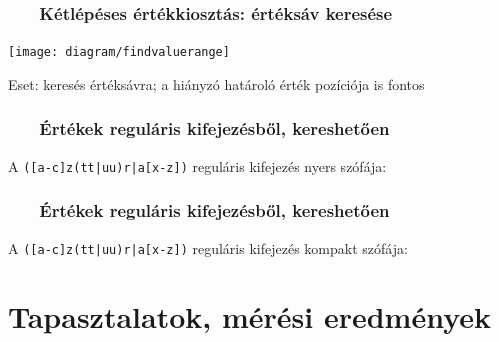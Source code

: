 \documentclass[
    aspectratio=169,
]{beamer}
\newcommand{\slidetitle}[2]{\frametitle{{\small #1 ~ \ding{226} ~ } \normalsize \textbf{#2} }}
\begin{document}
\begin{frame}
    \slidetitle{\sectionshorttitle}{Kétlépéses értékkiosztás: értéksáv keresése}
    
    \centering
    
    \texttt{[image: diagram/findvaluerange]}
    
    \vspace{0.7cm}
    
    Eset: keresés értéksávra; a hiányzó határoló érték pozíciója is fontos
\end{frame}

\begin{frame}[t]
    \slidetitle{\sectionshorttitle}{Értékek reguláris kifejezésből, kereshetően}
    \centering
    {\Large A \texttt{\colorbox{Goldenrod!10}{([a-c]z(tt|uu)r|a[x-z])}} reguláris kifejezés {\color{red}nyers} szófája:}
    
    \vspace{1.2cm}
    
    
\end{frame}

\begin{frame}[t,noframenumbering]
    \slidetitle{\sectionshorttitle}{Értékek reguláris kifejezésből, kereshetően}
    \centering
    {\Large A \texttt{\colorbox{Goldenrod!10}{([a-c]z(tt|uu)r|a[x-z])}} reguláris kifejezés {\color{red}kompakt} szófája:}
    
    \vspace{1.2cm}
    
    
\end{frame}

\section{Tapasztalatok, mérési eredmények}
\def\sectionshorttitle{\arabic{section}. Tapasztalatok}
\end{document}
